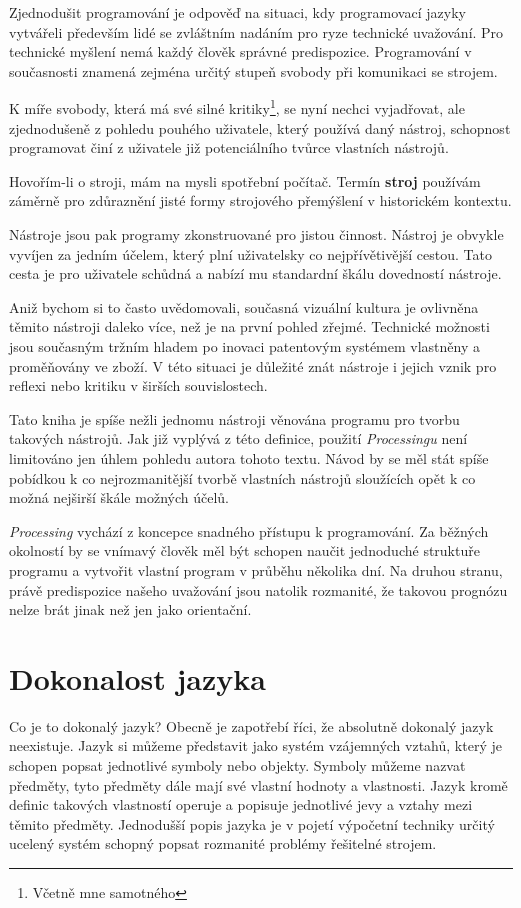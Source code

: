 \documentclass[10pt,twoside=true,open=right,cleardoublepage=empty,chapterprefix=true]{scrbook}
\newcommand{\oddil}[1]{\section{#1}\index{#1}\label{#1}}
\newcommand{\slovnik}[1]{\textbf{\gls{#1}}\index{#1}\label{#1}}
\newcommand{\lnb}{\linebreak}
\begin{document}
Zjednodušit programování je odpověď na situaci, kdy programovací jazyky vytvářeli především lidé se zvláštním nadáním pro ryze technické uvažování. Pro technické myšlení nemá každý člověk správné predispozice. Programování v současnosti znamená zejména určitý stupeň svobody při komunikaci se strojem.

K míře svobody, která má své silné kritiky\footnote{Včetně mne samotného}, se nyní nechci vyjadřovat, ale zjednodušeně z pohledu pouhého uživatele, který používá daný nástroj, schopnost programovat činí z uživatele již potenciálního tvůrce vlastních nástrojů.

Hovořím-li o stroji, mám na mysli spotřební počítač. Termín \slovnik{stroj} po\-užívám záměrně pro zdůraznění jisté formy strojového přemýšlení v historickém kontextu.

Nástroje jsou pak programy zkonstruované pro jistou činnost. Nástroj je obvykle vyvíjen za jedním účelem, který plní uživatelsky co nejpřívětivější cestou. Tato cesta je pro uživatele schůdná a nabízí mu standardní škálu dovedností nástroje.

Aniž bychom si to často uvědomovali, současná vizuální kultura je ovlivněna těmito nástroji daleko více, než je na první pohled zřejmé. Technické možnosti jsou současným tržním hladem po inovaci patentovým systémem vlastněny a proměňovány ve zboží. V této situaci je důležité znát nástroje i jejich vznik pro reflexi nebo kritiku v širších souvislostech.

Tato kniha je spíše nežli jednomu nástroji věnována programu pro tvorbu takových nástrojů. Jak již vyplývá z této definice, použití {\em Processingu} není limitováno jen úhlem pohledu autora tohoto textu. Návod by se měl stát spíše pobídkou k co nejrozmanitější tvorbě vlastních nástrojů sloužících opět k co možná nejširší škále možných účelů.

{\em Processing} vychází z koncepce snadného přístupu k programování. \lnb Za běžných okolností by se vnímavý člověk měl být schopen naučit jednoduché struktuře programu a vytvořit vlastní program v průběhu několika dní. Na druhou stranu, právě predispozice našeho uvažování jsou natolik rozmanité, že takovou prognózu nelze brát jinak než jen jako orientační.




\oddil{Dokonalost jazyka}

Co je to dokonalý jazyk? Obecně je zapotřebí říci, že absolutně dokonalý jazyk neexistuje. Jazyk si můžeme představit jako systém vzájemných vztahů, který je schopen popsat jednotlivé symboly nebo objekty. Symboly můžeme nazvat předměty, tyto předměty dále mají své vlastní hodnoty \lnb a vlastnosti. Jazyk kromě definic takových vlastností operuje a popisuje jednotlivé jevy a vztahy mezi těmito předměty. Jednodušší popis jazyka je \lnb v pojetí výpočetní techniky určitý ucelený systém schopný popsat rozmanité problémy řešitelné strojem.
\end{document}
